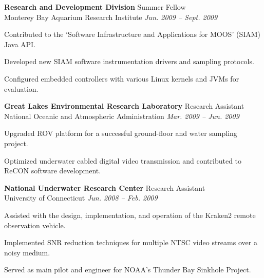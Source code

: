 \documentclass[margin, line]{resume}
\begin{document}
\begin{resume}
    \textbf{Research and Development Division} \hfill Summer Fellow \\ 
    Monterey Bay Aquarium Research Institute \hfill \textsl{Jun. 2009 -- Sept. 2009}  \\
    \vspace{ -2 mm}	
    \begin{list2}
	\item Contributed to the `Software Infrastructure and Applications for MOOS' (SIAM) Java API. 
	\item Developed new SIAM software instrumentation drivers and sampling protocols.
	\item Configured embedded controllers with various Linux kernels and JVMs for evaluation.
    \end{list2}\vspace{-2mm}
    
    \textbf{Great Lakes Environmental Research Laboratory } \hfill  Research Assistant \\ 
	National Oceanic and Atmospheric Administration \hfill \textsl{Mar. 2009 -- Jun. 2009} \\
    \vspace{ -2 mm}	
    \begin{list2}
	\item Upgraded ROV platform for a successful ground-floor and water sampling project.
	\item Optimized underwater cabled digital video transmission and contributed to ReCON software development.
    \end{list2}\vspace{-2mm}

    \textbf{National Underwater Research Center} \hfill Research Assistant \\ 
	University of Connecticut \hfill \textsl{Jun. 2008 -- Feb. 2009} \\
    \vspace{ -2 mm}	
    \begin{list2}
	\item Assisted with the design, implementation, and operation of the Kraken2 remote observation vehicle.
	\item Implemented SNR reduction techniques for multiple NTSC video streams over a noisy medium.
	\item Served as main pilot and engineer for NOAA's Thunder Bay Sinkhole Project. 
    \end{list2}\vspace{-2mm}


\end{resume}
\end{document}

